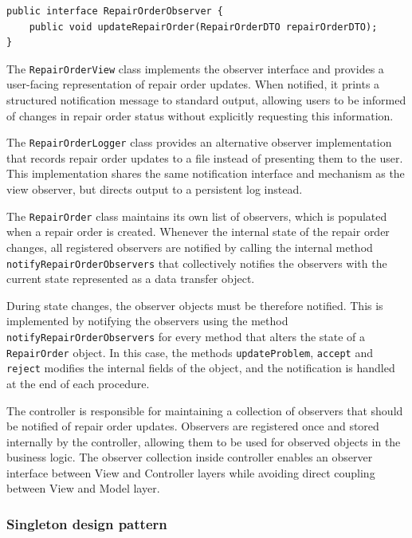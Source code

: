 \documentclass[a4paper]{scrartcl}
\begin{document}
\begin{lstlisting}[style=javastyle, caption={RepairOrderObserver interface}]
public interface RepairOrderObserver {
    public void updateRepairOrder(RepairOrderDTO repairOrderDTO);
}
\end{lstlisting}

The \texttt{RepairOrderView} class implements the observer interface and provides a user-facing representation of repair order updates. When notified, it prints a structured notification message to standard output, allowing users to be informed of changes in repair order status without explicitly requesting this information.

The \texttt{RepairOrderLogger} class provides an alternative observer implementation that records repair order updates to a file instead of presenting them to the user. This implementation shares the same notification interface and mechanism as the view observer, but directs output to a persistent log instead.

The \texttt{RepairOrder} class maintains its own list of observers, which is populated when a repair order is created. Whenever the internal state of the repair order changes, all registered observers are notified by calling the internal method \texttt{notifyRepairOrderObservers} that collectively notifies the observers with the current state represented as a data transfer object.

During state changes, the observer objects must be therefore notified. This is implemented by notifying the observers using the method \texttt{notifyRepairOrderObservers} for every method that alters the state of a \texttt{RepairOrder} object. In this case, the methods \texttt{updateProblem}, \texttt{accept} and \texttt{reject} modifies the internal fields of the object, and the notification is handled at the end of each procedure.

The controller is responsible for maintaining a collection of observers that should be notified of repair order updates. Observers are registered once and stored internally by the controller, allowing them to be used for observed objects in the business logic. The observer collection inside controller enables an observer interface between View and Controller layers while avoiding direct coupling between View and Model layer.

\subsubsection{Singleton design pattern}
\end{document}
